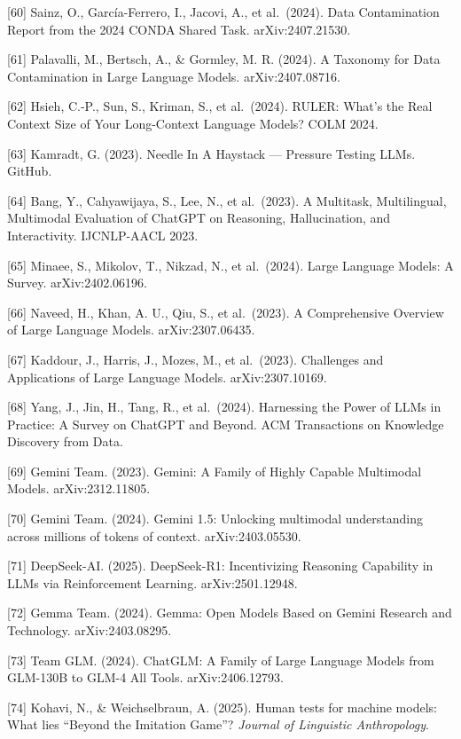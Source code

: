 {[}60{]} Sainz, O., García-Ferrero, I., Jacovi, A., et al.~(2024). Data Contamination Report from the 2024 CONDA Shared Task. arXiv:2407.21530.

{[}61{]} Palavalli, M., Bertsch, A., \& Gormley, M. R. (2024). A Taxonomy for Data Contamination in Large Language Models. arXiv:2407.08716.

{[}62{]} Hsieh, C.-P., Sun, S., Kriman, S., et al.~(2024). RULER: What's the Real Context Size of Your Long-Context Language Models? COLM 2024.

{[}63{]} Kamradt, G. (2023). Needle In A Haystack --- Pressure Testing LLMs. GitHub.

{[}64{]} Bang, Y., Cahyawijaya, S., Lee, N., et al.~(2023). A Multitask, Multilingual, Multimodal Evaluation of ChatGPT on Reasoning, Hallucination, and Interactivity. IJCNLP-AACL 2023.

{[}65{]} Minaee, S., Mikolov, T., Nikzad, N., et al.~(2024). Large Language Models: A Survey. arXiv:2402.06196.

{[}66{]} Naveed, H., Khan, A. U., Qiu, S., et al.~(2023). A Comprehensive Overview of Large Language Models. arXiv:2307.06435.

{[}67{]} Kaddour, J., Harris, J., Mozes, M., et al.~(2023). Challenges and Applications of Large Language Models. arXiv:2307.10169.

{[}68{]} Yang, J., Jin, H., Tang, R., et al.~(2024). Harnessing the Power of LLMs in Practice: A Survey on ChatGPT and Beyond. ACM Transactions on Knowledge Discovery from Data.

{[}69{]} Gemini Team. (2023). Gemini: A Family of Highly Capable Multimodal Models. arXiv:2312.11805.

{[}70{]} Gemini Team. (2024). Gemini 1.5: Unlocking multimodal understanding across millions of tokens of context. arXiv:2403.05530.

{[}71{]} DeepSeek-AI. (2025). DeepSeek-R1: Incentivizing Reasoning Capability in LLMs via Reinforcement Learning. arXiv:2501.12948.

{[}72{]} Gemma Team. (2024). Gemma: Open Models Based on Gemini Research and Technology. arXiv:2403.08295.

{[}73{]} Team GLM. (2024). ChatGLM: A Family of Large Language Models from GLM-130B to GLM-4 All Tools. arXiv:2406.12793.

{[}74{]} Kohavi, N., \& Weichselbraun, A. (2025). Human tests for machine models: What lies ``Beyond the Imitation Game''? \emph{Journal of Linguistic Anthropology}.

